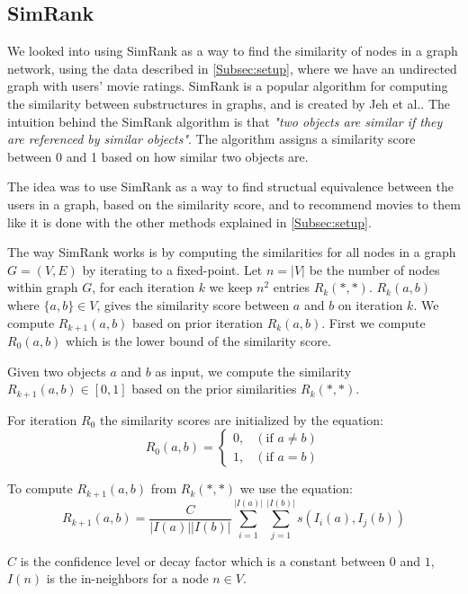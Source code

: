 \subsection{SimRank}
\label{Subsec:SimRank}
We looked into using SimRank as a way to find the similarity of nodes in a graph network, using the data described in \autoref{Subsec:setup}, where we have an undirected graph with users' movie ratings.
SimRank is a popular algorithm for computing the similarity between substructures in graphs, and is created by Jeh et al.\cite{10.1145/775047.775126}.
The intuition behind the SimRank algorithm is that \emph{"two objects are similar if they are referenced by similar objects"}\cite{10.1145/775047.775126}. The algorithm assigns a similarity score between 0 and 1 based on how similar two objects are.

The idea was to use SimRank as a way to find structual equivalence between the users in a graph, based on the similarity score, and to recommend movies to them like it is done with the other methods explained in \autoref{Subsec:setup}.

The way SimRank works is by computing the similarities for all nodes in a graph $G = (V,E)$ by iterating to a fixed-point.
Let $n = |V|$ be the number of nodes within graph $G$, for each iteration $k$ we keep $n^2$ entries $R_k(*,*)$.
$R_k(a,b)$ where $\{a,b\} \in V$, gives the similarity score between $a$ and $b$ on iteration $k$\cite{10.1145/775047.775126}.
We compute $R_{k+1}(a,b)$ based on prior iteration $R_k(a,b)$.
First we compute $R_0(a,b)$ which is the lower bound of the similarity score.

\begin{definition}[SimRank]\label{def:simrank} Given two objects $a$ and $b$ as input, we compute the similarity $R_{k+1}(a,b) \in [0,1]$ based on the prior similarities $R_k(*,*)$.

For iteration $R_0$ the similarity scores are initialized by the equation:
\begin{equation}\label{eq:lowerbound_sim_score}
R_0(a,b)= \begin{cases}
0, & (\text{if } a \neq b) \\

1 ,& (\text{if } a = b)
\end{cases}
\end{equation}

To compute $R_{k+1}(a,b)$ from $R_k(*,*)$ we use the equation:
\begin{equation}\label{eq:simrank_computation}
R_{k+1}(a,b)= \frac{C}{|I(a)||I(b)|}\sum^{|I(a)|}_{i=1}\sum^{|I(b)|}_{j=1}s(I_i(a),I_j(b))
\end{equation}

$C$ is the confidence level or decay factor which is a constant between $0$ and $1$, $I(n)$ is the in-neighbors for a node $n \in V$.

\end{definition}

